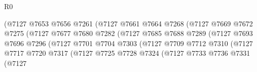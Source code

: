 \begin{lexlean}{R0}
\begin{coremodule}
                                        (@7127
                                          @7653
                                          @7656
                                          @7261
                                          (@7127
                                            @7661
                                            @7664
                                            @7268
                                            (@7127
                                              @7669
                                              @7672
                                              @7275
                                              (@7127
                                                @7677
                                                @7680
                                                @7282
                                                (@7127
                                                  @7685
                                                  @7688
                                                  @7289
                                                  (@7127
                                                    @7693
                                                    @7696
                                                    @7296
                                                    (@7127
                                                      @7701
                                                      @7704
                                                      @7303
                                                      (@7127
                                                        @7709
                                                        @7712
                                                        @7310
                                                        (@7127
                                                          @7717
                                                          @7720
                                                          @7317
                                                          (@7127
                                                            @7725
                                                            @7728
                                                            @7324
                                                            (@7127
                                                              @7733
                                                              @7736
                                                              @7331
                                                              (@7127

\end{coremodule}
\end{lexlean}

